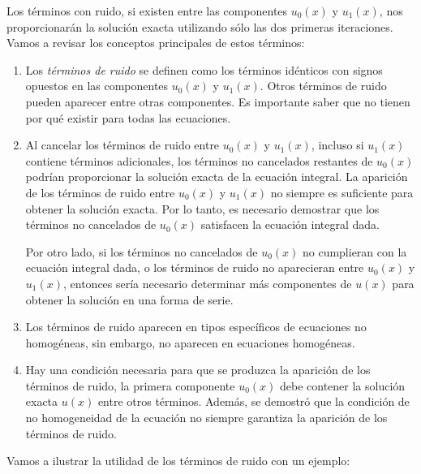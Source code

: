 Los términos con ruido, si existen entre las componentes $u_0(x)$ y $u_1(x)$, nos proporcionarán la solución exacta utilizando sólo las dos primeras iteraciones. Vamos a revisar los conceptos principales de estos términos:
\begin{enumerate}
	\item Los \textit{términos de ruido} se definen como los términos idénticos con signos opuestos en las componentes $u_0(x)$ y $u_1(x)$. Otros términos de ruido pueden aparecer entre otras componentes. Es importante saber que no tienen por qué existir para todas las ecuaciones.
	\item Al cancelar los términos de ruido entre $u_0(x)$ y $u_1(x)$, incluso si $u_1(x)$ contiene términos adicionales, los términos no cancelados restantes de $u_0(x)$ podrían proporcionar la solución exacta de la ecuación integral. La aparición de los términos de ruido entre $u_0(x)$ y $u_1(x)$ no siempre es suficiente para obtener la solución exacta. Por lo tanto, es necesario demostrar que los términos no cancelados de $u_0(x)$ satisfacen la ecuación integral dada. 
	
	Por otro lado, si los términos no cancelados de $u_0(x)$ no cumplieran con la ecuación integral dada, o los términos de ruido no aparecieran entre $u_0(x)$ y $u_1(x)$, entonces sería necesario determinar más componentes de $u(x)$ para obtener la solución en una forma de serie.
	\item Los términos de ruido aparecen en tipos específicos de ecuaciones no homogéneas, sin embargo, no aparecen en ecuaciones homogéneas.
	\item Hay una condición necesaria para que se produzca la aparición de los términos de ruido, la primera componente $u_0(x)$ debe contener la solución exacta $u(x)$ entre otros términos. Además, se demostró que la condición de no homogeneidad de la ecuación no siempre garantiza la aparición de los términos de ruido.
\end{enumerate}
Vamos a ilustrar la utilidad de los términos de ruido con un ejemplo:
